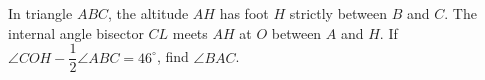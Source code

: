 In triangle $ABC$, the altitude $AH$ has foot $H$ strictly between $B$ and $C$. The internal angle bisector $CL$ meets $AH$ at $O$ between $A$ and $H$. If $\angle COH-\dfrac{1}{2}\angle ABC=46^\circ$, find $\angle BAC$.
